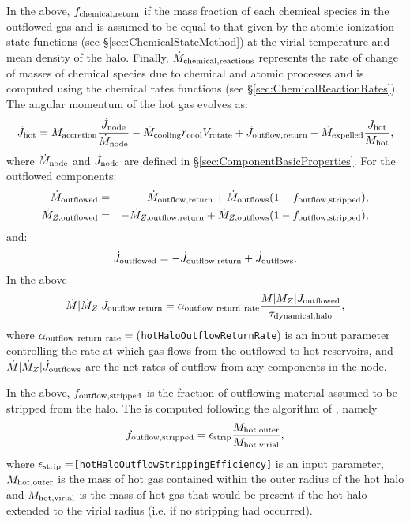 In the above, $f_{\rm chemical,return}$ if the mass fraction of each chemical species in the outflowed gas and is assumed to be equal to that given by the atomic ionization state functions (see \S\ref{sec:ChemicalStateMethod}) at the virial temperature and mean density of the halo. Finally, $\dot{M}_{\rm chemical,reactions}$ represents the rate of change of masses of chemical species due to chemical and atomic processes and is computed using the chemical rates functions (see \S\ref{sec:ChemicalReactionRates}). The angular momentum of the hot gas evolves as:
\begin{equation}
 \dot{J}_{\rm hot} = \dot{M}_{\rm accretion} {\dot{J}_{\rm node} \over \dot{M}_{\rm node}} - \dot{M}_{\rm cooling} r_{\rm cool} V_{\rm rotate} + \dot{J}_{\rm outflow,return} - \dot{M}_{\rm expelled} {J_{\rm hot} \over M_{\rm hot}},
\end{equation}
where $\dot{M}_{\rm node}$ and $\dot{J}_{\rm node}$ are defined in \S\ref{sec:ComponentBasicProperties}. For the outflowed components:
\begin{eqnarray}
 \dot{M}_{\rm outflowed} &=& - \dot{M}_{\rm outflow,return} + \dot{M}_{\rm outflows} (1-f_{\rm outflow, stripped}), \\
 \dot{M}_{Z, {\rm outflowed}} &=& - \dot{M}_{Z, {\rm outflow,return}} + \dot{M}_{Z, {\rm outflows}} (1-f_{\rm outflow, stripped}), \\
\end{eqnarray}
and:
\begin{equation}
 \dot{J}_{\rm outflowed} = - \dot{J}_{\rm outflow,return} + \dot{J}_{\rm outflows}.
\end{equation}
In the above
\begin{equation}
 \dot{M}|\dot{M}_Z|\dot{J}_{\rm outflow,return} = \alpha_{\rm outflow~return~rate} {M|M_Z|J_{\rm outflowed}\over \tau_{\rm dynamical, halo}},
\end{equation}
where $\alpha_{\rm outflow~return~rate}=(${\tt hotHaloOutflowReturnRate}) is an input parameter controlling the rate at which gas flows from the outflowed to hot reservoirs, and $\dot{M}|\dot{M}_Z|\dot{J}_{\rm outflows}$ are the net rates of outflow from any components in the node.

In the above, $f_{\rm outflow, stripped}$ is the fraction of outflowing material assumed to be stripped from the halo. The is computed following the algorithm of \cite{font_colours_2008}, namely
\begin{equation}
f_{\rm outflow, stripped} = \epsilon_{\rm strip} {M_{\rm hot, outer} \over  M_{\rm hot, virial}},
\end{equation}
where $\epsilon_{\rm strip}=${\tt [hotHaloOutflowStrippingEfficiency]} is an input parameter, $M_{\rm hot, outer}$ is the mass of hot gas contained within the outer radius of the hot halo and $M_{\rm hot, virial}$ is the mass of hot gas that would be present if the hot halo extended to the virial radius (i.e. if no stripping had occurred).

